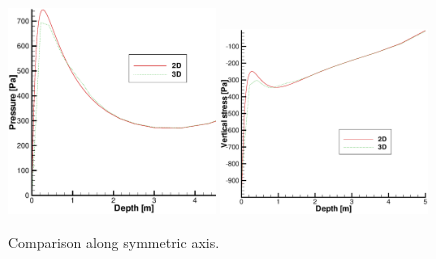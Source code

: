 \begin{figure}[!tbh]
\begin{center}
\includegraphics[width=0.49\textwidth]{chapter_14/figures/fig_14_1_5_a}
\includegraphics[width=0.49\textwidth]{chapter_14/figures/fig_14_1_5_b}
\end{center}
\caption{Comparison along symmetric axis.}  
\label{fig:e11}
\end{figure}

